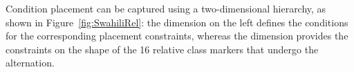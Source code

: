\documentclass[output=paper
                ,modfonts
                ,nonflat
	        ,collection
	        ,collectionchapter
	        ,collectiontoclongg
 	        ,biblatex
                ,babelshorthands
                ,newtxmath
                ,draftmode
                ,colorlinks, citecolor=brown
] {langscibook}
\begin{document}
{Condition placement can be captured using a two-dimensional hierarchy,
as shown in Figure~\ref{fig:SwahiliRel}: the 
dimension on the left defines the conditions for the corresponding
placement constraints, whereas the  dimension
provides the constraints on the shape of the 16 relative class markers
that undergo the alternation.   

\begin{figure}[htb]
  \centering


%
%
%


\end{figure}}
\end{document}
